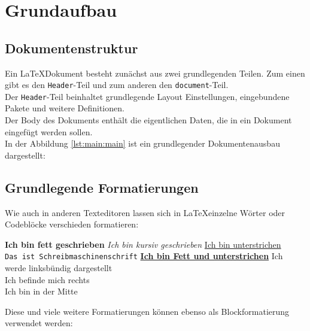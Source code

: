 \section{Grundaufbau}
\subsection{Dokumentenstruktur}
Ein \LaTeX Dokument besteht zunächst aus zwei grundlegenden Teilen. Zum einen 
gibt es den \texttt{Header}-Teil und zum anderen den \texttt{document}-Teil.
\\
Der  \texttt{Header}-Teil beinhaltet grundlegende Layout Einstellungen, 
eingebundene Pakete und weitere Definitionen.
\\
Der Body des Dokuments enthält die eigentlichen Daten, die in ein Dokument 
eingefügt werden sollen.
\\ In der Abbildung \ref{lst:main:main} ist ein grundlegender 
Dokumentenausbau dargestellt:


\subsection{Grundlegende Formatierungen}
Wie auch in anderen Texteditoren lassen sich in \LaTeX einzelne Wörter oder 
Codeblöcke verschieden formatieren: \\
\newline
\begin{flushleft}
\textbf{Ich bin fett geschrieben} \hspace{1cm}
\textit{Ich bin kursiv geschrieben} \hspace{1cm}
\underline{Ich bin unterstrichen} \\
\texttt{Das ist Schreibmaschinenschrift} \hspace{1cm}
\underline{\textbf{Ich bin Fett und unterstrichen}} 
\flushleft Ich werde linksbündig dargestellt \\
\flushright Ich befinde mich rechts \\
\center Ich bin in der Mitte
\end{flushleft}





Diese und viele weitere Formatierungen können ebenso als Blockformatierung 
verwendet werden:




